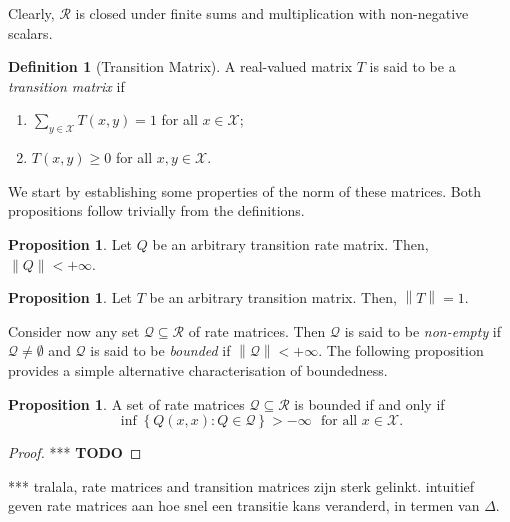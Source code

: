 \documentclass[10pt]{paper}
\theoremstyle{definition}
\newtheorem{proposition}[theorem]{Proposition}
\newtheorem{definition}{Definition}
\newcommand{\states}{\mathcal{X}}
\newcommand{\rateset}{\mathcal{Q}}
\newcommand{\norm}[1]{\left\lVert #1 \right\rVert}
\begin{document}
\noindent Clearly, $\mathcal{R}$ is closed under finite sums and multiplication with non-negative scalars. 

\begin{definition}[Transition Matrix]\label{def:stoch_matrix}
A real-valued matrix $T$ is said to be a \emph{transition matrix} if
\vspace{5pt}
\begin{enumerate}[label=S\arabic*:,ref=N\arabic*]
\item
$\sum_{y\in\states}T(x,y)=1$ for all $x\in\states$;\label{def:trans_matrix_is_stochastic}
\item
$T(x,y)\geq0$ for all $x,y\in\states$.
\end{enumerate}
\vspace{5pt}
\noindent
\end{definition}

\noindent We start by establishing some properties of the norm of these matrices. Both propositions follow trivially from the definitions.

\begin{proposition}
Let $Q$ be an arbitrary transition rate matrix. Then, $\norm{Q}<+\infty$.
\end{proposition}

\begin{proposition}
Let $T$ be an arbitrary transition matrix. Then, $\norm{T}=1$.
\end{proposition}

Consider now any set $\rateset\subseteq\mathcal{R}$ of rate matrices. Then $\rateset$ is said to be \emph{non-empty} if $\rateset\neq\emptyset$ and $\rateset$ is said to be \emph{bounded} if $\norm{\rateset}<+\infty$. The following proposition provides a simple alternative characterisation of boundedness.

\begin{proposition}\label{prop:alternativedefforbounded}
A set of rate matrices $\rateset\subseteq\mathcal{R}$ is bounded if and only if
\begin{equation*}
\inf\left\{Q(x,x)\colon Q\in\rateset\right\}>-\infty\text{~~for all $x\in\states$.}
\end{equation*}
\end{proposition}
\begin{proof}
*** {\bf TODO}
\end{proof}

*** tralala, rate matrices and transition matrices zijn sterk gelinkt.  intuitief geven rate matrices aan hoe snel een transitie kans veranderd, in termen van $\Delta$.
\end{document}

